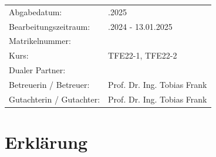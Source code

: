 \documentclass[openany]{scrbook} %
\newcommand{\abgabe}{13.01.2025}
\newcommand{\bearbeitungszeitraum}{09.10.2024 - 13.01.2025}
\newcommand{\matrikelnr}{5726700}
\newcommand{\kurs}{TFE22-1, TFE22-2}
\newcommand{\firma}{}
\newcommand{\betreuerfirma}{Prof. Dr. Ing. Tobias Frank}
\newcommand{\gutachterdhbw}{Prof. Dr. Ing. Tobias Frank}
\newcommand{\jahr}{2025} %
\begin{document}
\begin{titlepage}
\begin{center}
{\fontsize{12pt}{14pt}\selectfont
\begin{tabular}{ll}
Abgabedatum:                    & \quad \abgabe \\
Bearbeitungszeitraum:           & \quad \bearbeitungszeitraum \\
Matrikelnummer:                 & \quad \matrikelnr \\
Kurs:                           & \quad \kurs \\
Dualer Partner:                 & \quad \firma \\ %
Betreuerin / Betreuer:          & \quad \betreuerfirma \\ %
Gutachterin / Gutachter:        & \quad \gutachterdhbw \\ [2ex]
\end{tabular}
}
\end{center}


\end{titlepage}

\hypersetup{pageanchor=true}


\chapter*{Erklärung} %
\end{document}
